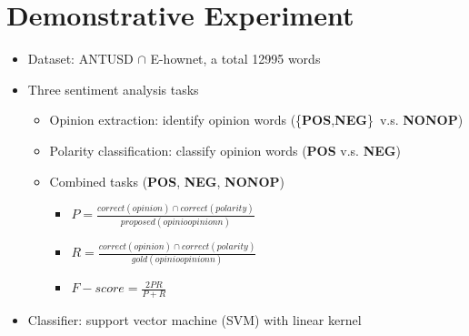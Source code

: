 \documentclass[compress]{beamer}
\begin{document}
\section{Demonstrative Experiment}
    \begin{frame}{\secname}
        \begin{itemize}
            \item Dataset: ANTUSD $\cap$ E-hownet, a total 12995 words
            \item Three sentiment analysis tasks
                \begin{itemize}
                    \item Opinion extraction: identify opinion words (\{\textbf{POS},\textbf{NEG}\}\ v.s. \textbf{NONOP})
                    \item Polarity classification: classify opinion words (\textbf{POS} v.s. \textbf{NEG})
                    \item Combined tasks (\textbf{POS}, \textbf{NEG}, \textbf{NONOP})
                    \begin{itemize}
                        \item $P=\frac{correct(opinion) \cap correct(polarity)}{proposed(opinioopinionn)}$
                        \item $R=\frac{correct(opinion) \cap correct(polarity)}{gold(opinioopinionn)}$
                        \item $F-score = \frac{2PR}{P+R}$
                    \end{itemize}

                \end{itemize}
            \item Classifier: support vector machine (SVM) with linear kernel
        \end{itemize}
    \end{frame}
\end{document}
